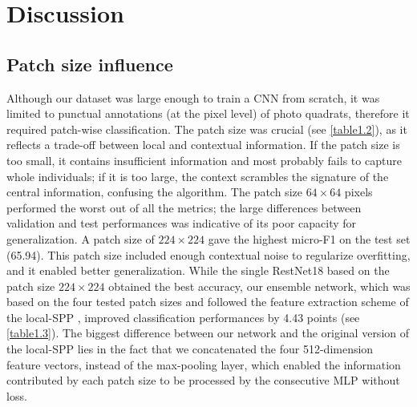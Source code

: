\newpage

\section{Discussion}\label{chapitre1_7}

\subsection{Patch size influence}\label{chapitre1_7.1}
Although our dataset was large enough to train a CNN from scratch, it was limited to punctual annotations (at the pixel level) of photo quadrats, therefore it required patch-wise classification. The patch size was crucial (see \autoref{table1.2}), as it reflects a trade-off between local and contextual information. If the patch size is too small, it contains insufficient information and most probably fails to capture whole individuals; if it is too large, the context scrambles the signature of the central information, confusing the algorithm. The patch size \(64 \times 64\) pixels performed the worst out of all the metrics; the large differences between validation and test performances was indicative of its poor capacity for generalization. A patch size of \(224 \times 224\) gave the highest micro-F1 on the test set (65.94). This patch size included enough contextual noise to regularize overfitting, and it enabled better generalization. While the single RestNet18 based on the patch size \(224 \times 224\) obtained the best accuracy, our ensemble network, which was based on the four tested patch sizes and followed the feature extraction scheme of the local-SPP \citep{mahmood_coral_2016}, improved classification performances by 4.43 points (see \autoref{table1.3}). The biggest difference between our network and the original version of the local-SPP lies in the fact that we concatenated the four 512-dimension feature vectors, instead of the max-pooling layer, which enabled the information contributed by each patch size to be processed by the consecutive MLP without loss.

